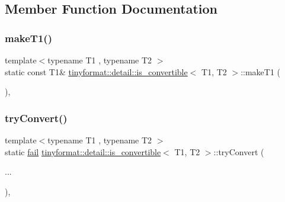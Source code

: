 \subsection{Member Function Documentation}
\mbox{\label{structtinyformat_1_1detail_1_1is__convertible_af2068cf5629a702c9ccb3b8136c6fe2e}} 
\subsubsection{\texorpdfstring{make\+T1()}{makeT1()}}
{\footnotesize\ttfamily template$<$typename T1 , typename T2 $>$ \\
static const T1\& \mbox{\hyperlink{structtinyformat_1_1detail_1_1is__convertible}{tinyformat\+::detail\+::is\+\_\+convertible}}$<$ T1, T2 $>$\+::make\+T1 (\begin{DoxyParamCaption}{ }\end{DoxyParamCaption})\hspace{0.3cm}{\ttfamily [static]}, {\ttfamily [private]}}

\mbox{\label{structtinyformat_1_1detail_1_1is__convertible_a304a3fb17a674e61c688dd1219875870}} 
\subsubsection{\texorpdfstring{try\+Convert()}{tryConvert()}\hspace{0.1cm}{\footnotesize\ttfamily [1/2]}}
{\footnotesize\ttfamily template$<$typename T1 , typename T2 $>$ \\
static \mbox{\hyperlink{structtinyformat_1_1detail_1_1is__convertible_1_1fail}{fail}} \mbox{\hyperlink{structtinyformat_1_1detail_1_1is__convertible}{tinyformat\+::detail\+::is\+\_\+convertible}}$<$ T1, T2 $>$\+::try\+Convert (\begin{DoxyParamCaption}\item[{}]{... }\end{DoxyParamCaption})\hspace{0.3cm}{\ttfamily [static]}, {\ttfamily [private]}}

